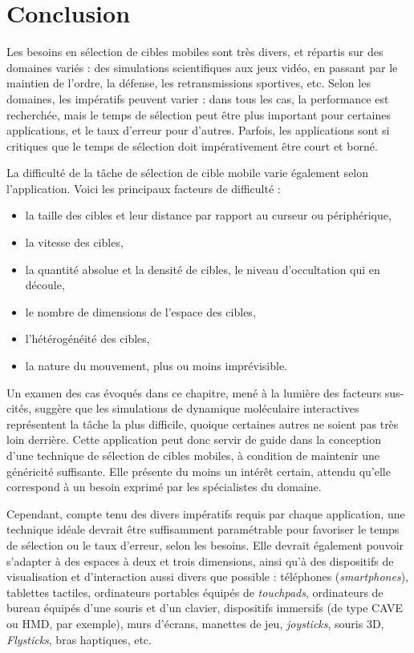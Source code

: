 	
	\section{Conclusion}    
	Les besoins en sélection de cibles mobiles sont très divers, et répartis sur des domaines variés : des simulations scientifiques aux jeux vidéo, en passant par le maintien de l'ordre, la défense, les retransmissions sportives, etc. Selon les domaines, les impératifs peuvent varier : dans tous les cas, la performance est recherchée, mais le temps de sélection peut être plus important pour certaines applications, et le taux d'erreur pour d'autres. Parfois, les applications sont si critiques que le temps de sélection doit impérativement être court et borné.
	
	La difficulté de la tâche de sélection de cible mobile varie également selon l'application. Voici les principaux facteurs de difficulté :
	\begin{itemize}
		\item la taille des cibles et leur distance par rapport au \og curseur \fg{} ou périphérique,
		\item la vitesse des cibles,
		\item la quantité absolue et la densité de cibles, le niveau d'occultation qui en découle,
		\item le nombre de dimensions de l'espace des cibles,
		\item l'hétérogénéité des cibles,
		\item la nature du mouvement, plus ou moins imprévisible.
	\end{itemize}
	
	Un examen des cas évoqués dans ce chapitre, mené à la lumière des facteurs sus-cités, suggère que les simulations de dynamique moléculaire interactives représentent la tâche la plus difficile, quoique certaines autres ne soient pas très loin derrière. Cette application peut donc servir de guide dans la conception d'une technique de sélection de cibles mobiles, à condition de maintenir une généricité suffisante. Elle présente du moins un intérêt certain, attendu qu'elle correspond à un besoin exprimé par les spécialistes du domaine.
	
	Cependant, compte tenu des divers impératifs requis par chaque application, une technique idéale devrait être suffisamment paramétrable pour favoriser le temps de sélection ou le taux d'erreur, selon les besoins. Elle devrait également pouvoir s'adapter à des espaces à deux et trois dimensions, ainsi qu'à des dispositifs de visualisation et d'interaction aussi divers que possible : téléphones (\emph{smartphones}), tablettes tactiles, ordinateurs portables équipés de \emph{touchpads}, ordinateurs de bureau équipés d'une souris et d'un clavier, dispositifs immersifs (de type CAVE ou HMD, par exemple), murs d'écrans, manettes de jeu, \emph{joysticks}, souris 3D, \emph{Flysticks}\footnotemark, bras haptiques, etc.
	
